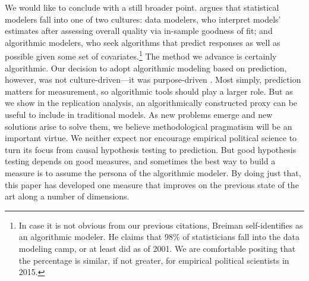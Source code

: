 We would like to conclude with a still broader point.
\citet{Breiman:2001fd} argues that statistical modelers fall into one of two cultures: data modelers, who interpret models' estimates after assessing overall quality via in-sample goodness of fit; and algorithmic modelers, who seek algorithms that predict responses as well as possible given some set of covariates.\footnote{%
  In case it is not obvious from our previous citations, Breiman self-identifies as an algorithmic modeler.
  He claims that 98\% of statisticians fall into the data modeling camp, or at least did as of 2001.
  We are comfortable positing that the percentage is similar, if not greater, for empirical political scientists in 2015.
}
The method we advance is certainly algorithmic.
Our decision to adopt algorithmic modeling based on prediction, however, was not culture-driven---it was purpose-driven \citep{clarke2012}.
Most simply, prediction matters for measurement, so algorithmic tools should play a larger role.
But as we show in the replication analysis, an algorithmically constructed proxy can be useful to include in traditional models.
As new problems emerge and new solutions arise to solve them, we believe methodological pragmatism will be an important virtue.
We neither expect nor encourage empirical political science to turn its focus from causal hypothesis testing to prediction.
But good hypothesis testing depends on good measures, and sometimes the best way to build a measure is to assume the persona of the algorithmic modeler.
By doing just that, this paper has developed one measure that improves on the previous state of the art along a number of dimensions.

